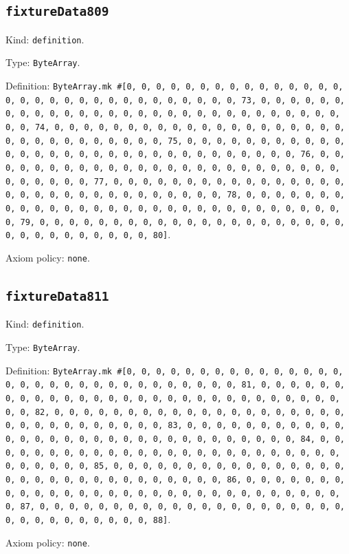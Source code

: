 \documentclass[11pt]{article}
\begin{document}
\subsection*{\texttt{fixtureData809}}
\noindent Kind: \texttt{definition}.\par
\noindent Type: \texttt{ByteArray}.\par
\noindent Definition: \texttt{ByteArray.mk \#[0, 0, 0, 0, 0, 0, 0, 0, 0, 0, 0, 0, 0, 0, 0, 0, 0, 0, 0, 0, 0, 0, 0, 0, 0, 0, 0, 0, 0, 0, 0, 73, 0, 0, 0, 0, 0, 0, 0, 0, 0, 0, 0, 0, 0, 0, 0, 0, 0, 0, 0, 0, 0, 0, 0, 0, 0, 0, 0, 0, 0, 0, 0, 74, 0, 0, 0, 0, 0, 0, 0, 0, 0, 0, 0, 0, 0, 0, 0, 0, 0, 0, 0, 0, 0, 0, 0, 0, 0, 0, 0, 0, 0, 0, 0, 75, 0, 0, 0, 0, 0, 0, 0, 0, 0, 0, 0, 0, 0, 0, 0, 0, 0, 0, 0, 0, 0, 0, 0, 0, 0, 0, 0, 0, 0, 0, 0, 76, 0, 0, 0, 0, 0, 0, 0, 0, 0, 0, 0, 0, 0, 0, 0, 0, 0, 0, 0, 0, 0, 0, 0, 0, 0, 0, 0, 0, 0, 0, 0, 77, 0, 0, 0, 0, 0, 0, 0, 0, 0, 0, 0, 0, 0, 0, 0, 0, 0, 0, 0, 0, 0, 0, 0, 0, 0, 0, 0, 0, 0, 0, 0, 78, 0, 0, 0, 0, 0, 0, 0, 0, 0, 0, 0, 0, 0, 0, 0, 0, 0, 0, 0, 0, 0, 0, 0, 0, 0, 0, 0, 0, 0, 0, 0, 79, 0, 0, 0, 0, 0, 0, 0, 0, 0, 0, 0, 0, 0, 0, 0, 0, 0, 0, 0, 0, 0, 0, 0, 0, 0, 0, 0, 0, 0, 0, 0, 80]}.\par
\noindent Axiom policy: \texttt{none}.\par
\subsection*{\texttt{fixtureData811}}
\noindent Kind: \texttt{definition}.\par
\noindent Type: \texttt{ByteArray}.\par
\noindent Definition: \texttt{ByteArray.mk \#[0, 0, 0, 0, 0, 0, 0, 0, 0, 0, 0, 0, 0, 0, 0, 0, 0, 0, 0, 0, 0, 0, 0, 0, 0, 0, 0, 0, 0, 0, 0, 81, 0, 0, 0, 0, 0, 0, 0, 0, 0, 0, 0, 0, 0, 0, 0, 0, 0, 0, 0, 0, 0, 0, 0, 0, 0, 0, 0, 0, 0, 0, 0, 82, 0, 0, 0, 0, 0, 0, 0, 0, 0, 0, 0, 0, 0, 0, 0, 0, 0, 0, 0, 0, 0, 0, 0, 0, 0, 0, 0, 0, 0, 0, 0, 83, 0, 0, 0, 0, 0, 0, 0, 0, 0, 0, 0, 0, 0, 0, 0, 0, 0, 0, 0, 0, 0, 0, 0, 0, 0, 0, 0, 0, 0, 0, 0, 84, 0, 0, 0, 0, 0, 0, 0, 0, 0, 0, 0, 0, 0, 0, 0, 0, 0, 0, 0, 0, 0, 0, 0, 0, 0, 0, 0, 0, 0, 0, 0, 85, 0, 0, 0, 0, 0, 0, 0, 0, 0, 0, 0, 0, 0, 0, 0, 0, 0, 0, 0, 0, 0, 0, 0, 0, 0, 0, 0, 0, 0, 0, 0, 86, 0, 0, 0, 0, 0, 0, 0, 0, 0, 0, 0, 0, 0, 0, 0, 0, 0, 0, 0, 0, 0, 0, 0, 0, 0, 0, 0, 0, 0, 0, 0, 87, 0, 0, 0, 0, 0, 0, 0, 0, 0, 0, 0, 0, 0, 0, 0, 0, 0, 0, 0, 0, 0, 0, 0, 0, 0, 0, 0, 0, 0, 0, 0, 88]}.\par
\noindent Axiom policy: \texttt{none}.\par
\end{document}
